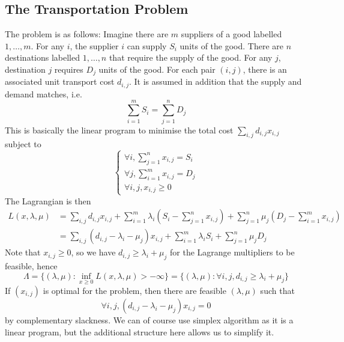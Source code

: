 \subsection{The Transportation Problem}
The problem is as follows:
Imagine there are $m$ suppliers of a good labelled $1,\ldots,m$.
For any $i$, the supplier $i$ can supply $S_i$ units of the good.
There are $n$ destinations labelled $1,\ldots,n$ that require the supply of the good.
For any $j$, destination $j$ requires $D_j$ units of the good.
For each pair $(i,j)$, there is an associated unit transport cost $d_{i,j}$.
It is assumed in addition that the supply and demand matches, i.e.
$$\sum_{i=1}^mS_i=\sum_{j=1}^nD_j$$
This is basically the linear program to minimise the total cost $\sum_{i,j}d_{i,j}x_{i,j}$ subject to
$$\begin{cases}
    \forall i,\sum_{j=1}^nx_{i,j}=S_i\\
    \forall j,\sum_{i=1}^mx_{i,j}=D_j\\
    \forall i,j,x_{i,j}\ge 0
\end{cases}$$
The Lagrangian is then
\begin{align*}
    L(x,\lambda,\mu)&=\sum_{i,j}d_{i,j}x_{i,j}+\sum_{i=1}^m\lambda_i\left( S_i-\sum_{j=1}^n x_{i,j} \right)+\sum_{j=1}^n\mu_j\left( D_j-\sum_{i=1}^mx_{i,j} \right)\\
    &=\sum_{i,j}(d_{i,j}-\lambda_i-\mu_j)x_{i,j}+\sum_{i=1}^m\lambda_iS_i+\sum_{j=1}^n\mu_jD_j
\end{align*}
Note that $x_{i,j}\ge 0$, so we have $d_{i,j}\ge \lambda_i+\mu_j$ for the Lagrange multipliers to be feasible, hence
$$\Lambda=\{(\lambda,\mu):\inf_{x\ge 0}L(x,\lambda,\mu)>-\infty\}=\{(\lambda,\mu):\forall i,j,d_{i,j}\ge \lambda_i+\mu_j\}$$
If $(x_{i,j})$ is optimal for the problem, then there are feasible $(\lambda,\mu)$ such that
$$\forall i,j,(d_{i,j}-\lambda_i-\mu_j)x_{i,j}=0$$
by complementary slackness.
We can of course use simplex algorithm as it is a linear program, but the additional structure here allows us to simplify it.
